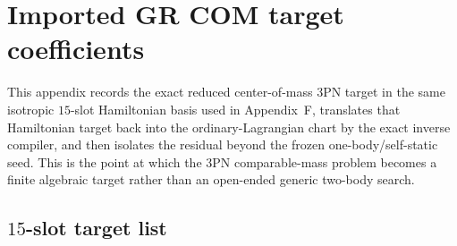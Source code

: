 \documentclass[11pt]{article}
\begin{document}

\section{Imported GR COM target coefficients}
\label{app:gr-com-target}

This appendix records the exact reduced center-of-mass $3$PN target in the
same isotropic $15$-slot Hamiltonian basis used in Appendix~F, translates that
Hamiltonian target back into the ordinary-Lagrangian chart by the exact inverse
compiler, and then isolates the residual beyond the frozen one-body/self-static
seed. This is the point at which the $3$PN comparable-mass problem becomes a
finite algebraic target rather than an open-ended generic two-body search.

\subsection{\texorpdfstring{$15$}{15}-slot target list}
\label{app:gr-com-target-list}
\end{document}

